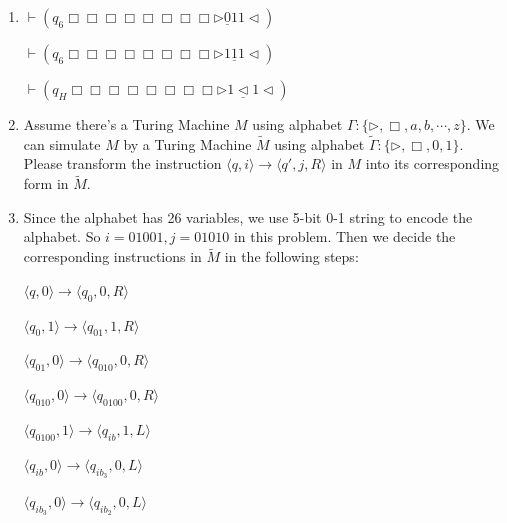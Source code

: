 \documentclass[12pt,a4paper]{article}
\makeatletter
\newtheorem*{solution}{Solution}
\theoremstyle{definition}
\renewenvironment{solution}[1][Solution] {\par\pushQED{\qed}\normalfont\topsep6\p@\@plus6\p@\relax\trivlist\item[\hskip\labelsep\bfseries#1\@addpunct{.}]\ignorespaces}{\popQED\endtrivlist\@endpefalse} \makeatother
\makeatother
\begin{document}
\begin{enumerate}
\begin{solution}
\begin{enumerate}
\begin{minipage}{0.3\textwidth}
\begin{center}
				$\vdash (q_6\Box \Box \Box\Box\Box\Box\Box\Box\triangleright\underline{0}1 1\triangleleft)$
				
				$\vdash (q_6\Box \Box \Box\Box\Box\Box\Box\Box\triangleright1\underline{1} 1\triangleleft)$
				
				$\vdash (q_H\Box \Box \Box\Box\Box\Box\Box\Box\triangleright1\underline{\triangleleft} 1\triangleleft)$
			\end{center}
		\end{minipage}
	\end{enumerate}
\end{solution}

\item Assume there's a Turing Machine $M$ using alphabet $\Gamma :\{ \triangleright, \Box, a, b, \cdots, z\}$. We can simulate $M$ by a Turing Machine $\tilde{M}$ using alphabet $\tilde{\Gamma }:\{ \triangleright, \Box, 0, 1\}$. Please transform the instruction $\langle q, i \rangle \rightarrow \langle q',j, R\rangle$ in $M$ into its corresponding form in $\tilde{M}$.

\begin{solution}
	Since the alphabet has 26 variables, we use 5-bit 0-1 string to encode the alphabet. So $ i = 01001, j = 01010 $ in this problem. Then we decide the corresponding instructions in $ \tilde{M} $ in the following steps:
	
	\begin{minipage}{0.45\textwidth}
		\begin{center}
			
			$\langle q,0\rangle\rightarrow\langle q_{0},0,R\rangle$
			
			$\langle q_{0},1\rangle\rightarrow\langle q_{01},1,R\rangle$
			
			$\langle q_{01},0\rangle\rightarrow\langle q_{010},0,R\rangle$
			
			$\langle q_{010},0\rangle\rightarrow\langle q_{0100},0,R\rangle$
			
			$\langle q_{0100},1\rangle\rightarrow\langle q_{ib},1,L\rangle$
			
			
			$\langle q_{ib},0\rangle\rightarrow\langle q_{ib_{3}},0,L\rangle$
		\end{center}
	\end{minipage}
	\begin{minipage}{0.45\textwidth}
		\begin{center}
			$\langle q_{ib_{3}},0\rangle\rightarrow\langle q_{ib_{2}},0,L\rangle$
			

\end{center}
\end{minipage}
\end{solution}
\end{enumerate}
\end{document}

